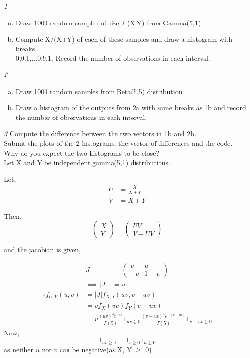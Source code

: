 \documentclass[12pt,letterpaper]{article}
\begin{document}
\textit{1}
\begin{enumerate}[a.]
  \item Draw 1000 random samples of size 2 (X,Y) from Gamma(5,1).
  \item Compute X/(X+Y) of each of these samples and draw a histogram with breaks\\0,0.1,...0.9,1. Record the number of observations in each interval.
\end{enumerate}
\textit{2}
\begin{enumerate}[a.]
  \item Draw 1000 random samples from Beta(5,5) distribution.
  \item Draw a histogram of the outputs from 2a with same breaks as 1b and record the number of observations in each interval.
\end{enumerate}
\textit{3} Compute the difference between the two vectors in 1b and 2b.\\
Submit the plots of the 2 histograms, the vector of differences and the code.\\
Why do you expect the two histograms to be close?\\

\vspace{2em}
Let X and Y be independent gamma(5,1) distributions.

Let,
\begin{align*}
  U &= \frac{X}{X+Y}\\
  V &= X+Y
\end{align*}

Then, 
$$\begin{pmatrix}
  X\\
  Y
\end{pmatrix}
=
\begin{pmatrix}
  UV\\
  V-UV
\end{pmatrix}$$

and the jacobian is given,

\begin{align*}
  J &= \begin{pmatrix}
    v & u\\
    -v & 1-u
  \end{pmatrix}\\
  \implies |J| &= v
\end{align*}
\begin{align*}
  \therefore f_{U,V}(u, v) &= |J| f_{X,Y}(uv, v-uv)\\
  &= v f_X(uv) f_Y(v-uv)\\
  &= v \frac{(uv)^4 e^{-uv}}{\Gamma(5)}1_{uv \geq 0}\frac{(v-uv)^4 e^{-(v-uv)}}{\Gamma(5)}1_{v-uv \geq 0}
\end{align*}
\newpage
Now,
$$1_{uv \geq 0} = 1_{v \geq 0} 1_{u \geq 0}$$
as neither $u$ nor $v$ can be negative(as X, Y $\geq$ 0)
\end{document}
